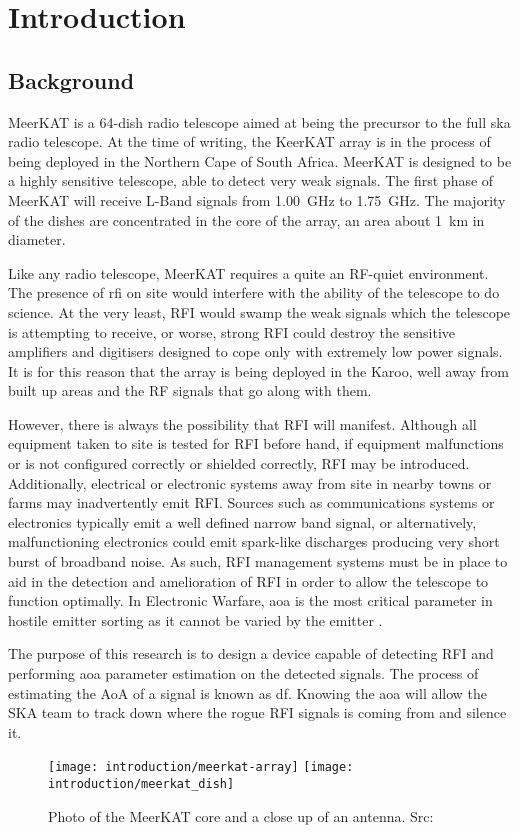 \chapter{Introduction}
\label{ch:introduction}
\section{Background}
MeerKAT is a 64-dish radio telescope aimed at being the precursor to the full \gls{ska} radio telescope. At the time of writing, the KeerKAT array is in the process of being deployed in the Northern Cape of South Africa.
MeerKAT is designed to be a highly sensitive telescope, able to detect very weak signals. The first phase of MeerKAT will receive L-Band signals from \SI{1.00}{\giga\hertz} to \SI{1.75}{\giga\hertz}. The majority of the dishes are concentrated in the core of the array, an area about \SI{1}{\kilo\meter} in diameter.

Like any radio telescope, MeerKAT requires a quite an RF-quiet environment.
The presence of \gls{rfi} on site would interfere with the ability of the telescope to do science. At the very least, RFI would swamp the weak signals which the telescope is attempting to receive, or  worse, strong RFI could destroy the sensitive amplifiers and digitisers designed to cope only with extremely low power signals.
It is for this reason that the array is being deployed in the Karoo, well away from built up areas and the RF signals that go along with them.

However, there is always the possibility that RFI will manifest. 
Although all equipment taken to site is tested for RFI before hand, if equipment malfunctions or is not configured correctly or shielded correctly, RFI may be introduced. Additionally, electrical or electronic systems away from site in nearby towns or farms may inadvertently emit RFI. 
Sources such as communications systems or electronics typically emit a well defined narrow band signal, or alternatively, malfunctioning electronics could emit spark-like discharges producing very short burst of broadband noise.
As such, RFI management systems must be in place to aid in the detection and amelioration of RFI in order to allow the telescope to function optimally. In Electronic Warfare, \gls{aoa} is the most critical parameter in hostile emitter sorting as it cannot be varied by the emitter \cite{center2012electronic}.

The purpose of this research is to design a device capable of detecting RFI and performing \gls{aoa} parameter estimation on the detected signals.
The process of estimating the AoA of a signal is known as \gls{df}.
Knowing the \gls{aoa} will allow the SKA team to track down where the rogue RFI signals is coming from and silence it.

\begin{figure}[hb]
  \centering
  \texttt{[image: introduction/meerkat-array]}
  \texttt{[image: introduction/meerkat\_dish]}
  \caption{Photo of the MeerKAT core and a close up of an antenna. Src: \cite{skasawebsite}}
\end{figure}



